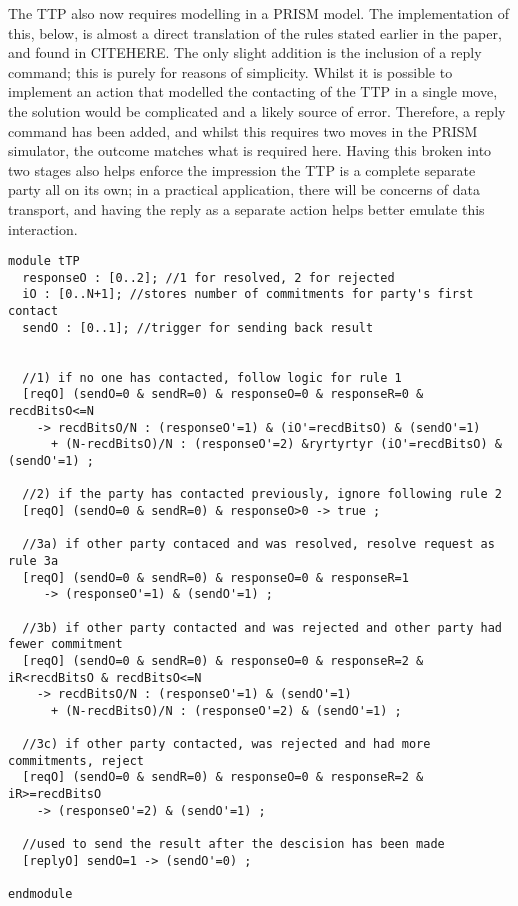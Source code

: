 \documentclass{l4proj}
\begin{document}
The TTP also now requires modelling in a PRISM model. The implementation of this, below, is almost a direct translation of the rules stated earlier in the paper, and found in CITEHERE. The only slight addition is the inclusion of a reply command; this is purely for reasons of simplicity. Whilst it is possible to implement an action that modelled the contacting of the TTP in a single move, the solution would be complicated and a likely source of error. Therefore, a reply command has been added, and whilst this requires two moves in the PRISM simulator, the outcome matches what is required here. Having this broken into two stages also helps enforce the impression the TTP is a complete separate party all on its own; in a practical application, there will be concerns of data transport, and having the reply as a separate action helps better emulate this interaction.
\begin{lstlisting}
module tTP
  responseO : [0..2]; //1 for resolved, 2 for rejected
  iO : [0..N+1]; //stores number of commitments for party's first contact
  sendO : [0..1]; //trigger for sending back result

        
  //1) if no one has contacted, follow logic for rule 1
  [reqO] (sendO=0 & sendR=0) & responseO=0 & responseR=0 & recdBitsO<=N 
    -> recdBitsO/N : (responseO'=1) & (iO'=recdBitsO) & (sendO'=1)  
      + (N-recdBitsO)/N : (responseO'=2) &ryrtyrtyr (iO'=recdBitsO) & (sendO'=1) ;

  //2) if the party has contacted previously, ignore following rule 2
  [reqO] (sendO=0 & sendR=0) & responseO>0 -> true ;
    
  //3a) if other party contaced and was resolved, resolve request as rule 3a
  [reqO] (sendO=0 & sendR=0) & responseO=0 & responseR=1 
     -> (responseO'=1) & (sendO'=1) ;

  //3b) if other party contacted and was rejected and other party had fewer commitment
  [reqO] (sendO=0 & sendR=0) & responseO=0 & responseR=2 & iR<recdBitsO & recdBitsO<=N 
    -> recdBitsO/N : (responseO'=1) & (sendO'=1) 
      + (N-recdBitsO)/N : (responseO'=2) & (sendO'=1) ;

  //3c) if other party contacted, was rejected and had more commitments, reject
  [reqO] (sendO=0 & sendR=0) & responseO=0 & responseR=2 & iR>=recdBitsO 
    -> (responseO'=2) & (sendO'=1) ;

  //used to send the result after the descision has been made
  [replyO] sendO=1 -> (sendO'=0) ;

endmodule

\end{lstlisting}
\end{document}
